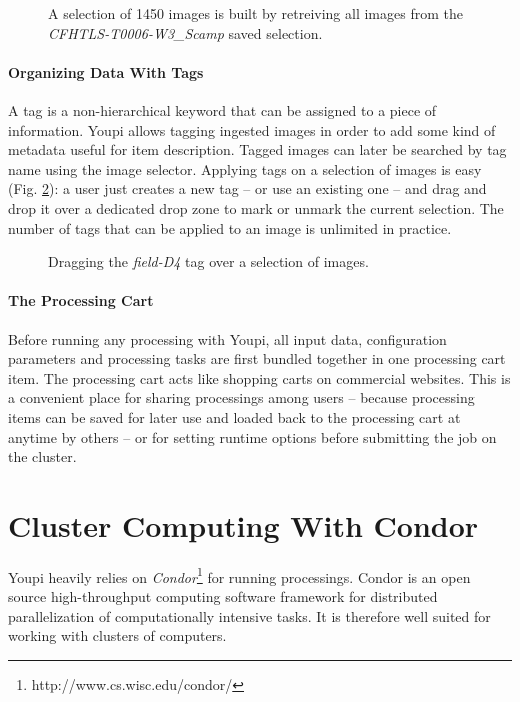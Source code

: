 \documentclass[11pt,twoside]{article}  %
\begin{document}
\begin{figure}[h]
\caption{A selection of 1450 images is built by retreiving all images from the 
\emph{CFHTLS-T0006-W3\_Scamp} saved selection.}\label{fig:ims}
\end{figure}

\paragraph{Organizing Data With Tags}

A tag is a non-hierarchical keyword that can be assigned to a piece of information. Youpi allows 
tagging ingested images in order to add some kind of metadata useful for item description. Tagged 
images can later be searched by tag name using the image selector. Applying tags on a selection of 
images is easy (Fig. \ref{fig:tags}): a user just creates a new tag -- or use an existing one -- and 
drag and drop it over a dedicated drop zone to mark or unmark the current selection. The number 
of tags that can be applied to an image is unlimited in practice.

\begin{figure}[h]
\caption{Dragging the \emph{field-D4} tag over a selection of images.}\label{fig:tags}
\end{figure}

\paragraph{The Processing Cart}

Before running any processing with Youpi, all input data, configuration parameters and processing 
tasks are first bundled together in one processing cart item. The processing cart acts like shopping 
carts on commercial websites. This is a convenient place for sharing processings among users -- 
because processing items can be saved for later use and loaded back to the processing cart at 
anytime by others -- or for setting runtime options before submitting the job on the cluster.

\section{Cluster Computing With Condor}

Youpi heavily relies on \emph{Condor}\footnote{http://www.cs.wisc.edu/condor/} for running processings. Condor is an open source 
high-throughput computing software framework for distributed parallelization of computationally 
intensive tasks. It is therefore well suited for working with clusters of computers.
\end{document}
